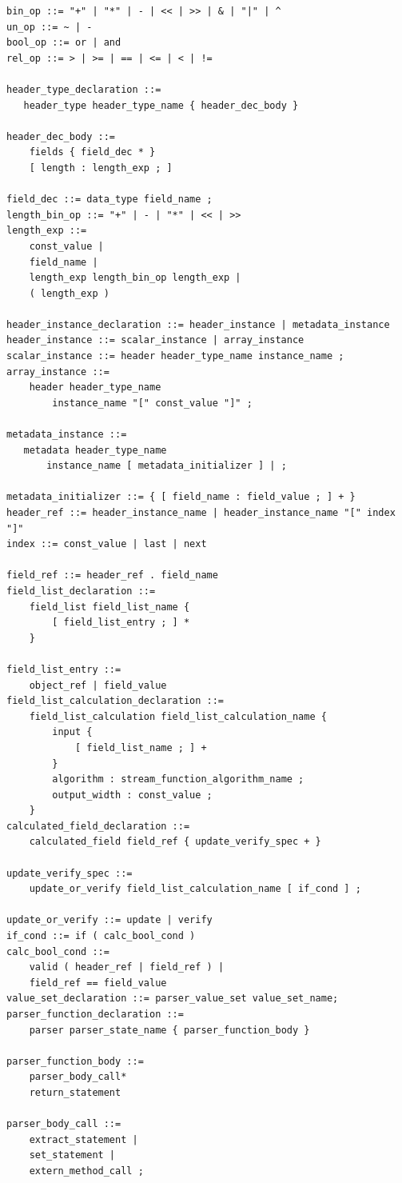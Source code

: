 \documentclass[12pt]{article}
\begin{document}
\begin{lstlisting}[style=BNFstyle]
bin_op ::= "+" | "*" | - | << | >> | & | "|" | ^
un_op ::= ~ | -
bool_op ::= or | and
rel_op ::= > | >= | == | <= | < | !=

header_type_declaration ::= 
   header_type header_type_name { header_dec_body }

header_dec_body ::=
    fields { field_dec * }
    [ length : length_exp ; ]

field_dec ::= data_type field_name ;
length_bin_op ::= "+" | - | "*" | << | >>
length_exp ::=
    const_value |
    field_name |
    length_exp length_bin_op length_exp |
    ( length_exp )

header_instance_declaration ::= header_instance | metadata_instance
header_instance ::= scalar_instance | array_instance
scalar_instance ::= header header_type_name instance_name ;
array_instance ::=
    header header_type_name 
        instance_name "[" const_value "]" ;

metadata_instance ::= 
   metadata header_type_name
       instance_name [ metadata_initializer ] | ;

metadata_initializer ::= { [ field_name : field_value ; ] + }
header_ref ::= header_instance_name | header_instance_name "[" index "]"
index ::= const_value | last | next

field_ref ::= header_ref . field_name
field_list_declaration ::=
    field_list field_list_name {
        [ field_list_entry ; ] *
    }

field_list_entry ::= 
    object_ref | field_value
field_list_calculation_declaration ::=
    field_list_calculation field_list_calculation_name {
        input {
            [ field_list_name ; ] +
        }
        algorithm : stream_function_algorithm_name ;
        output_width : const_value ;
    }
calculated_field_declaration ::=
    calculated_field field_ref { update_verify_spec + }

update_verify_spec ::=
    update_or_verify field_list_calculation_name [ if_cond ] ;

update_or_verify ::= update | verify
if_cond ::= if ( calc_bool_cond )
calc_bool_cond ::=
    valid ( header_ref | field_ref ) |
    field_ref == field_value
value_set_declaration ::= parser_value_set value_set_name;
parser_function_declaration ::=
    parser parser_state_name { parser_function_body }

parser_function_body ::=
    parser_body_call*
    return_statement

parser_body_call ::=
    extract_statement |
    set_statement |
    extern_method_call ;


\end{lstlisting}
\end{document}
